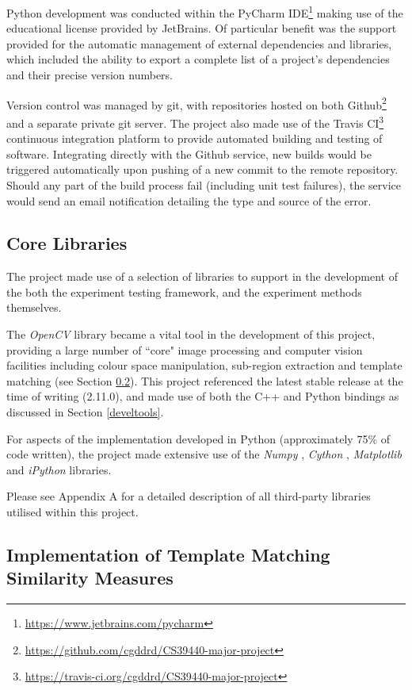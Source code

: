 Python development was conducted within the PyCharm IDE\footnote{\url{https://www.jetbrains.com/pycharm}} making use of the educational license provided by JetBrains. Of particular benefit was the support provided for the automatic management of external dependencies and libraries, which included the ability to export a complete list of a project's dependencies and their precise version numbers.

Version control was managed by git, with repositories hosted on both Github\footnote{\url{https://github.com/cgddrd/CS39440-major-project}} and a separate private git server. The project also made use of the Travis CI\footnote{\url{https://travis-ci.org/cgddrd/CS39440-major-project}} continuous integration platform to provide automated building and testing of software. Integrating directly with the Github service, new builds would be triggered automatically upon pushing of a new commit to the remote repository. Should any part of the build process fail (including unit test failures), the service would send an email notification detailing the type and source of the error.  

\subsection{Core Libraries}
\label{libs}

The project made use of a selection of libraries to support in the development of the both the experiment testing framework, and the experiment methods themselves. 

The \textit{OpenCV} library \cite{opencv} became a vital tool in the development of this project, providing a large number of ``core" image processing and computer vision facilities including colour space manipulation, sub-region extraction and template matching (see Section \ref{templmatchopencv}). This project referenced the latest stable release at the time of writing (2.11.0), and made use of both the C++ and Python bindings as discussed in Section \ref{develtools}.

For aspects of the implementation developed in Python (approximately 75\% of code written), the project made extensive use of the \textit{Numpy} \cite{numpy}, \textit{Cython} \cite{cython}, \textit{Matplotlib} \cite{matplotlib} and \textit{iPython} \cite{ipython} libraries. 

Please see Appendix A for a detailed description of all third-party libraries utilised within this project.

\subsection{Implementation of Template Matching Similarity Measures}
\label{templmatchopencv}

